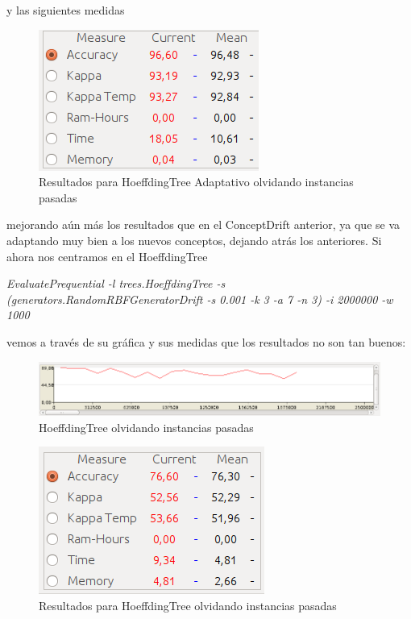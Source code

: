 y las siguientes medidas 

\begin{figure}[H] %
	\centering
	\includegraphics[scale=0.5]{measures41.png}  %
	\caption{Resultados para HoeffdingTree Adaptativo olvidando instancias pasadas} 
	\label{fig:measure41}
\end{figure}

mejorando aún más los resultados que en el ConceptDrift anterior, ya que se va adaptando muy bien a los nuevos conceptos, dejando atrás los anteriores. Si ahora nos centramos en el HoeffdingTree

\textit{EvaluatePrequential -l trees.HoeffdingTree -s (generators.RandomRBFGeneratorDrift -s 0.001 -k 3 -a 7 -n 3) -i 2000000 -w 1000}

vemos a través de su gráfica y sus medidas que los resultados no son tan buenos:

\begin{figure}[H] %
	\centering
	\includegraphics[scale=0.4]{graph42.png}  %
	\caption{HoeffdingTree olvidando instancias pasadas} 
	\label{fig:graph42}
\end{figure}

\begin{figure}[H] %
	\centering
	\includegraphics[scale=0.5]{measures42.png}  %
	\caption{Resultados para HoeffdingTree  olvidando instancias pasadas} 
	\label{fig:measure42}
\end{figure}

